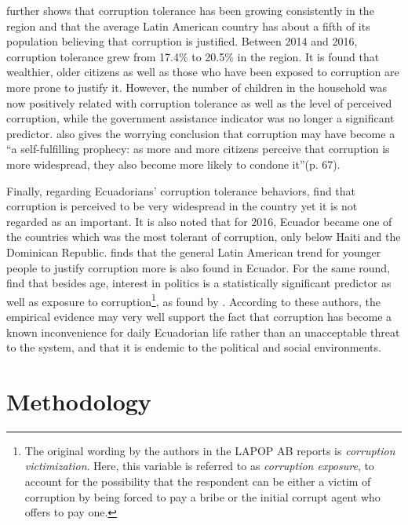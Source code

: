 \documentclass[12pt,a4]{article}\usepackage[]{graphicx}\usepackage[]{xcolor}
\begin{document}
\textcite{Lupu.2017} further shows that corruption tolerance has been growing consistently in the region and that the average Latin American country has about a fifth of its population believing that corruption is justified. Between 2014 and 2016, corruption tolerance grew from 17.4\% to 20.5\% in the region. It is found that wealthier, older citizens as well as those who have been exposed to corruption are more prone to justify it. However, the number of children in the household was now positively related with corruption tolerance as well as the level of perceived corruption, while the government assistance indicator was no longer a significant predictor. \textcite{Lupu.2017} also gives the worrying conclusion that corruption may have become a \enquote{a self-fulfilling prophecy: as more and more citizens perceive that corruption is more widespread, they also become more likely to condone it}(p. 67). 

Finally, regarding Ecuadorians' corruption tolerance behaviors, \textcite{Moscoso.2018} find that corruption is perceived to be very widespread in the country yet it is not regarded as an important. It is also noted that for 2016, Ecuador became one of the countries which was the most tolerant of corruption, only below Haiti and the Dominican Republic. \textcite{Montalvo.2019} finds that the general Latin American trend for younger people to justify corruption more is also found in Ecuador. For the same round, \textcite{Moscoso.2020} find that besides age, interest in politics is a statistically significant predictor as well as exposure to corruption\footnote{The original wording by the authors in the LAPOP AB reports is \textit{corruption victimization}. Here, this variable is referred to as \textit{corruption exposure}, to account for the possibility that the respondent can be either a victim of corruption by being forced to pay a bribe or the initial corrupt agent who offers to pay one.}, as found by \textcite{Lupu.2017}. According to these authors, the empirical evidence may very well support the fact that corruption has become a known inconvenience for daily Ecuadorian life rather than an unacceptable threat to the system, and that it is endemic to the political and social environments. 








\section{Methodology}
\label{sec:methodology} %
\end{document}
